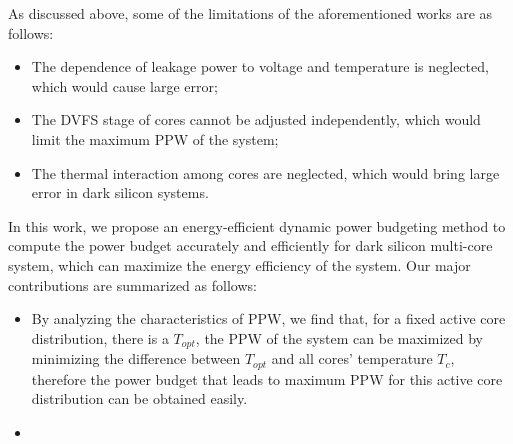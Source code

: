 As discussed above, some of the limitations of the aforementioned works are as follows:
\begin{itemize}  
\item The dependence of leakage power to voltage and temperature is neglected, which would cause large error;
\item The DVFS stage of cores cannot be adjusted independently, which would limit the maximum PPW of the system;
\item The thermal interaction among cores are neglected, which would bring large error in dark silicon systems.
\end{itemize} 

In this work, we propose an energy-efficient dynamic power budgeting method to compute the power budget accurately and efficiently for dark silicon multi-core system, which can maximize the energy efficiency of the system. Our major contributions are summarized as follows:
\begin{itemize}

\item By analyzing the characteristics of PPW, we find that, for a fixed active core distribution, there is a $T_{opt}$, the PPW of the system can be maximized by minimizing the difference between $T_{opt}$ and all cores' temperature $T_{c}$, therefore the power budget that leads to maximum PPW for this active core distribution can be obtained easily.
\item 
\end{itemize} 